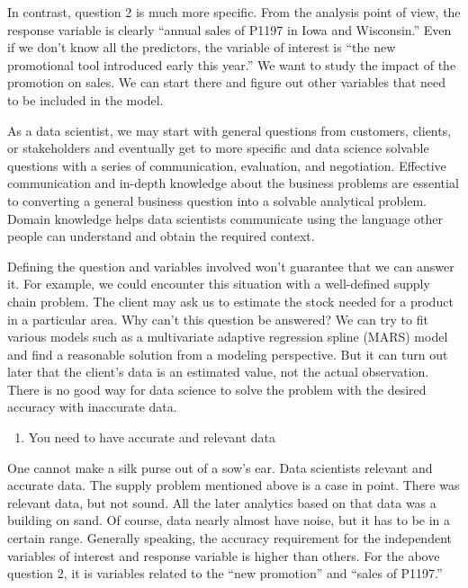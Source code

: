 \documentclass[
  12pt,
]{krantz}
\providecommand{\tightlist}{%
  \setlength{\itemsep}{0pt}\setlength{\parskip}{0pt}}
\begin{document}
In contrast, question 2 is much more specific. From the analysis point of view, the response variable is clearly ``annual sales of P1197 in Iowa and Wisconsin.'' Even if we don't know all the predictors, the variable of interest is ``the new promotional tool introduced early this year.'' We want to study the impact of the promotion on sales. We can start there and figure out other variables that need to be included in the model.

As a data scientist, we may start with general questions from customers, clients, or stakeholders and eventually get to more specific and data science solvable questions with a series of communication, evaluation, and negotiation. Effective communication and in-depth knowledge about the business problems are essential to converting a general business question into a solvable analytical problem. Domain knowledge helps data scientists communicate using the language other people can understand and obtain the required context.

Defining the question and variables involved won't guarantee that we can answer it. For example, we could encounter this situation with a well-defined supply chain problem. The client may ask us to estimate the stock needed for a product in a particular area. Why can't this question be answered? We can try to fit various models such as a multivariate adaptive regression spline (MARS) model and find a reasonable solution from a modeling perspective. But it can turn out later that the client's data is an estimated value, not the actual observation. There is no good way for data science to solve the problem with the desired accuracy with inaccurate data.

\begin{enumerate}
\def\labelenumi{\arabic{enumi}.}
\setcounter{enumi}{1}
\tightlist
\item
  You need to have accurate and relevant data
\end{enumerate}

One cannot make a silk purse out of a sow's ear. Data scientists relevant and accurate data. The supply problem mentioned above is a case in point. There was relevant data, but not sound. All the later analytics based on that data was a building on sand. Of course, data nearly almost have noise, but it has to be in a certain range. Generally speaking, the accuracy requirement for the independent variables of interest and response variable is higher than others. For the above question 2, it is variables related to the ``new promotion'' and ``sales of P1197.''
\end{document}
